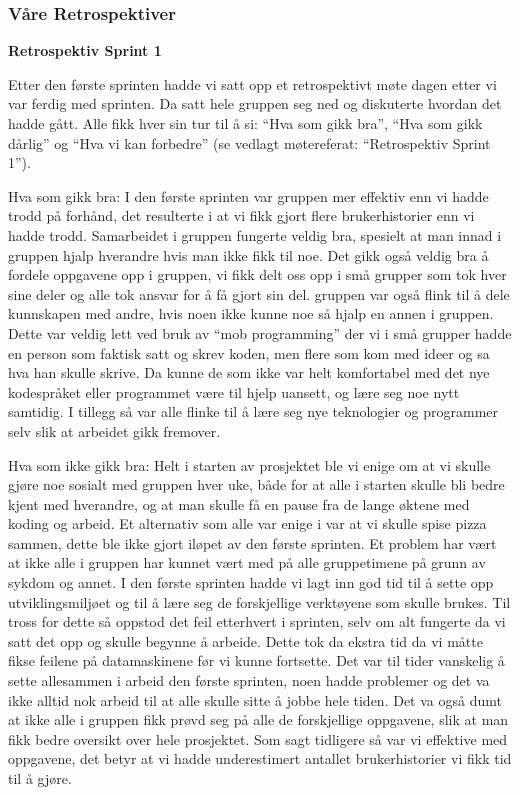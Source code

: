 \documentclass[12pt,a4paper,norsk]{article}
\begin{document}
	\subsubsection{Våre Retrospektiver}
	
\bigskip \noindent \textbf{Retrospektiv Sprint 1}
\par Etter den første sprinten hadde vi satt opp et retrospektivt møte dagen etter vi var ferdig med sprinten. Da satt hele gruppen seg ned og diskuterte hvordan det hadde gått. Alle fikk hver sin tur til å si: “Hva som gikk bra”, “Hva som gikk dårlig” og “Hva vi kan forbedre” (se vedlagt møtereferat: “Retrospektiv Sprint 1”).
 
Hva som gikk bra:
I den første sprinten var gruppen mer effektiv enn vi hadde trodd på forhånd, det resulterte i at vi fikk gjort flere brukerhistorier enn vi hadde trodd. Samarbeidet i gruppen fungerte veldig bra, spesielt at man innad i gruppen hjalp hverandre hvis man ikke fikk til noe. Det gikk også veldig bra å fordele oppgavene opp i gruppen, vi fikk delt oss opp i små grupper som tok hver sine deler og alle tok ansvar for å få gjort sin del. gruppen var også flink til å dele kunnskapen med andre, hvis noen ikke kunne noe så hjalp en annen i gruppen. Dette var veldig lett ved bruk av “mob programming” der vi i små grupper hadde en person som faktisk satt og skrev koden, men flere som kom med ideer og sa hva han skulle skrive. Da kunne de som ikke var helt komfortabel med det nye kodespråket eller programmet være til hjelp uansett, og lære seg noe nytt samtidig. I tillegg så var alle flinke til å lære seg nye teknologier og programmer selv slik at arbeidet gikk fremover. 

Hva som ikke gikk bra:
Helt i starten av prosjektet ble vi enige om at vi skulle gjøre noe sosialt med gruppen hver uke, både for at alle i starten skulle bli bedre kjent med hverandre, og at man skulle få en pause fra de lange øktene med koding og arbeid. Et alternativ som alle var enige i var at vi skulle spise pizza sammen, dette ble ikke gjort iløpet av den første sprinten.  
Et problem har vært at ikke alle i gruppen har kunnet vært med på alle gruppetimene på grunn av sykdom og annet. 
I den første sprinten hadde vi lagt inn god tid til å sette opp utviklingsmiljøet og til å lære seg de forskjellige verktøyene som skulle brukes. Til tross for dette så oppstod det feil etterhvert i sprinten, selv om alt fungerte da vi satt det opp og skulle begynne å arbeide. Dette tok da ekstra tid da vi måtte fikse feilene på datamaskinene før vi kunne fortsette. 
Det var til tider vanskelig å sette allesammen i arbeid den første sprinten, noen hadde problemer og det va ikke alltid nok arbeid til at alle skulle sitte å jobbe hele tiden. Det va også dumt at ikke alle i gruppen fikk prøvd seg på alle de forskjellige oppgavene, slik at man fikk bedre oversikt over hele prosjektet. 
Som sagt tidligere så var vi effektive med oppgavene, det betyr at vi hadde underestimert antallet brukerhistorier vi fikk tid til å gjøre.
\end{document}
